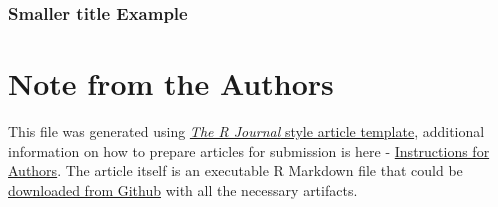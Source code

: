\hypertarget{smaller-title-example}{%
\subsubsection{Smaller title Example}\label{smaller-title-example}}



\hypertarget{note-from-the-authors}{%
\section{Note from the Authors}\label{note-from-the-authors}}

This file was generated using
\href{https://github.com/rstudio/rticles}{\emph{The R Journal} style
article template}, additional information on how to prepare articles for
submission is here -
\href{https://journal.r-project.org/share/author-guide.pdf}{Instructions
for Authors}. The article itself is an executable R Markdown file that
could be
\href{https://github.com/ivbsoftware/big-data-final-2/blob/master/docs/R_Journal/big-data-final-2/}{downloaded
from Github} with all the necessary artifacts.


\address{%
Vadim Spirkov\\
York University School of Continuing Studies\\
\\
}


\address{%
Murlidhar Loka\\
York University School of Continuing Studies\\
\\
}


